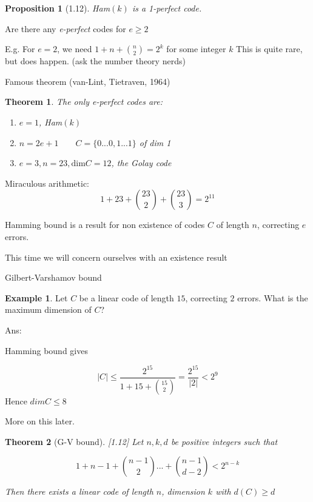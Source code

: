 \documentclass[]{article}
\newtheorem*{thm*}{Theorem}
\newtheorem{prop}[thm]{Proposition}
\theoremstyle{definition}
\newtheorem*{exmp}{Example}
\theoremstyle{remark}
\numberwithin{equation}{section}
\begin{document}
		\begin{prop}[1.12]
			Ham$(k)$ is a 1-perfect code.
		\end{prop}

		Are there any \emph{e-perfect} codes for $e\geq2$

		E.g.\newline
		For $e=2$, we need $1+n + \binom{n}{2} = 2^k$ for some integer $k$ \newline
		This is quite rare, but does happen. (ask the number theory nerds)
		\par
		Famous theorem (van-Lint, Tietraven, 1964)

		\begin{thm*}
		The only \emph{e-perfect} codes are:
			\begin{enumerate}
				\item $e=1$, Ham$(k)$
				\item $n=2e+1\qquad C=\{0 ... 0, 1 ... 1\}$ of dim 1
				\item $e=3, n=23, \text{dim}C = 12$, the \em{Golay code}
			\end{enumerate}

		\end{thm*}
		Miraculous arithmetic:
		\[
			1 + 23 + \binom{23}{2} + \binom{23}{3} = 2^{11}
		\]

		Hamming bound is a result for non existence of codes $C$ of length $n$, correcting $e$ errors.

		This time we will concern ourselves with an existence result


		Gilbert-Varshamov bound

		\begin{exmp}
		Let $C$ be a linear code of length $15$, correcting $2$ errors. What is the maximum dimension of $C$?

		Ans:

		Hamming bound gives

		\[
			|C| \leq \frac{2^15}{1+15 +\binom{15}{2}} = \frac{2^15}{|2|} < 2^9
		\]
		Hence $dimC \leq 8$

		More on this later.
		\end{exmp}

		\begin{thm*}[G-V bound][1.12]
		Let $n,k, d$ be positive integers such that

		\[
			1 + n-1 + \binom{n-1}{2} ... + \binom{n-1}{d-2} < 2^{n-k}
		\]

		Then there exists a linear code of length $n$, dimension $k$ with $d(C) \geq d$
		\end{thm*}
\end{document}
